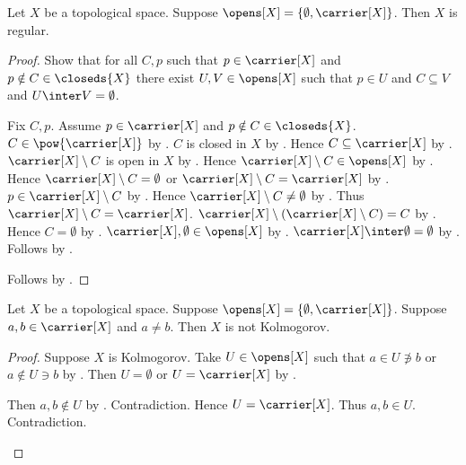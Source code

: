 \begin{proposition}\label{indiscrete_space_is_regular}
    Let $X$ be a topological space.
    Suppose $\opens[X]=\{\emptyset,\carrier[X]\}$.
    Then $X$ is regular.
\end{proposition}
\begin{proof}
    Show that for all $C,p$ such that $p\in\carrier[X]$ and
        $p\notin C\in\closeds{X}$ there exist $U,V\in\opens[X]$
        such that $p\in U$ and $C\subseteq V$ and
        $U\inter V=\emptyset$.
    \begin{subproof}
        Fix $C,p$.
        Assume $p\in\carrier[X]$ and $p\notin C\in\closeds{X}$.
        $C\in\pow{\carrier[X]}$ by .
        $C$ is closed in $X$ by .
        Hence $C\subseteq\carrier[X]$ by .
        $\carrier[X]\setminus C$ is open in $X$
            by .
        Hence $\carrier[X]\setminus C\in\opens[X]$ by .
        Hence $\carrier[X]\setminus C=\emptyset$ or
            $\carrier[X]\setminus C=\carrier[X]$
            by .
        $p\in\carrier[X]\setminus C$ by .
        Hence $\carrier[X]\setminus C\neq\emptyset$ by .
        Thus $\carrier[X]\setminus C=\carrier[X]$.
        $\carrier[X]\setminus(\carrier[X]\setminus C)=C$
            by .
        Hence $C=\emptyset$ by .
        $\carrier[X],\emptyset\in\opens[X]$
            by .
        $\carrier[X]\inter\emptyset=\emptyset$ by .
        Follows by .
    \end{subproof}
    Follows by .
\end{proof}

\begin{proposition}\label{nontrivial_indiscrete_space_is_not_kolmogorov}
    Let $X$ be a topological space.
    Suppose $\opens[X]=\{\emptyset,\carrier[X]\}$.
    Suppose $a,b\in\carrier[X]$ and $a\neq b$.
    Then $X$ is not Kolmogorov.
\end{proposition}
\begin{proof}
    Suppose $X$ is Kolmogorov.
    Take $U\in\opens[X]$ such that
        $a\in U\not\ni b$ or $a\notin U\ni b$
        by .
    Then $U=\emptyset$ or $U=\carrier[X]$
        by .
    \begin{byCase}
        Then $a,b\notin U$ by .
        Contradiction.
        Hence $U=\carrier[X]$.
        Thus $a,b\in U$.
        Contradiction.
    \end{byCase}
\end{proof}

